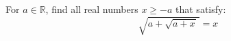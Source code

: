 For $a \in \mathbb{R}$, find all real numbers $x \ge -a$ that satisfy:
\begin{equation*}
  \sqrt{a + \sqrt{a + x \mspace{2mu}} \mspace{2mu}} = x
\end{equation*}
